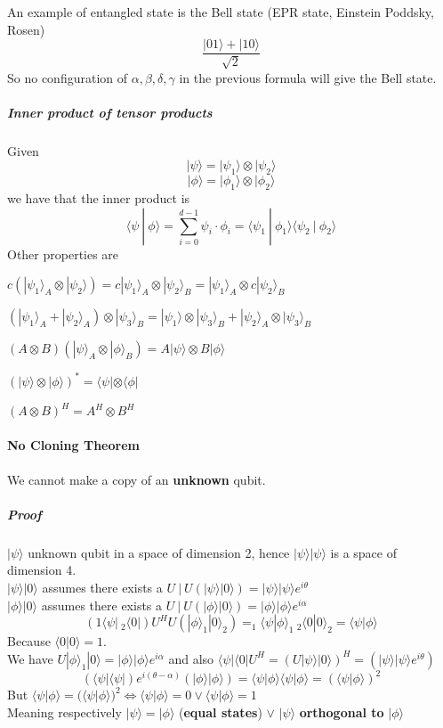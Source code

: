 \documentclass[10pt]{report}
\begin{document}
An example of entangled state is the Bell state (EPR state, Einstein Poddsky, Rosen) $$\frac{|01\rangle + |10\rangle}{\sqrt{2}}$$
So no configuration of $\alpha,\beta,\delta,\gamma$ in the previous formula will give the Bell state.
\subparagraph{Inner product of tensor products} Given
$$|\psi\rangle = |\psi_1\rangle\otimes|\psi_2\rangle$$
$$|\phi\rangle = |\phi_1\rangle\otimes|\phi_2\rangle$$
we have that the inner product is
$$\langle \psi\:|\:\phi\rangle = \sum_{i=0}^{d-1}\psi_i\cdot\phi_i = \langle \psi_1\:|\:\phi_1\rangle\langle \psi_2\:|\:\phi_2\rangle$$
Other properties are\begin{list}{}{}
	\item $c(|\psi_1\rangle_A\otimes|\psi_2\rangle) = c|\psi_1\rangle_A\otimes |\psi_2\rangle_B = |\psi_1\rangle_A\otimes c|\psi_2\rangle_B$
	\item $(|\psi_1\rangle_A+|\psi_2\rangle_A)\otimes|\psi_3\rangle_B = |\psi_1\rangle\otimes|\psi_3\rangle_B + |\psi_2\rangle_A\otimes|\psi_3\rangle_B$
	\item $(A\otimes B)(|\psi\rangle_A\otimes|\phi\rangle_B) = A|\psi\rangle \otimes B|\phi\rangle$
	\item $(|\psi\rangle\otimes|\phi\rangle)^* = \langle\psi|\otimes\langle\phi|$
	\item $(A\otimes B)^H = A^H\otimes B^H$
\end{list}
\paragraph{No Cloning Theorem} We cannot make a copy of an \textbf{unknown} qubit.
\subparagraph{Proof} $|\psi\rangle$ unknown qubit in a space of dimension 2, hence $|\psi\rangle|\psi\rangle$ is a space of dimension 4.\\
$|\psi\rangle|0\rangle$ assumes there exists a $U\:|\:U(|\psi\rangle|0\rangle)=|\psi\rangle|\psi\rangle e^{i\theta}$\\
$|\phi\rangle|0\rangle$ assumes there exists a $U\:|\:U(|\phi\rangle|0\rangle)=|\phi\rangle|\phi\rangle e^{i\alpha}$
$$(1\langle\psi|\:_2\langle 0|)U^HU(|\phi\rangle_1|0\rangle_2) = _1\langle\psi|\phi\rangle_1\:_2\langle0|0\rangle_2 = \langle\psi|\phi\rangle$$
Because $\langle0|0\rangle = 1$.\\
We have $U|\phi\rangle_1|0\rangle = |\phi\rangle|\phi\rangle e^{i\alpha}$ and also $\langle\psi|\langle 0|U^H = (U|\psi\rangle|0\rangle)^H = (|\psi\rangle|\psi\rangle e^{i\theta})$
$$(\langle\psi|\langle\psi|)e^{i(\theta-\alpha)}(|\phi\rangle|\phi\rangle) = \langle\psi|\phi\rangle\langle\psi|\phi\rangle = (\langle\psi|\phi\rangle)^2$$
But $\langle\psi|\phi\rangle = (\langle\psi|\phi\rangle)^2 \Leftrightarrow \langle\psi|\phi\rangle = 0 \vee \langle\psi|\phi\rangle = 1$\\
Meaning respectively $|\psi\rangle = |\phi\rangle$ (\textbf{equal states}) $\vee$ $|\psi\rangle$ \textbf{orthogonal to} $|\phi\rangle$
\end{document}
